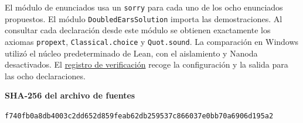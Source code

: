 \documentclass[spanish,11pt,a4paper]{article}
\begin{document}
El módulo de enunciados usa un \texttt{sorry} para cada uno de los ocho enunciados propuestos. El módulo \texttt{DoubledEarsSolution} importa las demostraciones. Al consultar cada declaración desde este módulo se obtienen exactamente los axiomas \texttt{propext}, \texttt{Classical.choice} y \texttt{Quot.sound}. La comparación en Windows utilizó el núcleo predeterminado de Lean, con el aislamiento y Nanoda desactivados. El \href{https://github.com/jtraverso/nash-williams-triangle-decompositions-release/tree/doubled-ears-preprint-1.0-r3/series_notes/DOUBLED_EAR_ABSORBERS/preprint-1.0/formalization}{registro de verificación} recoge la configuración y la salida para las ocho declaraciones.

\textbf{SHA-256 del archivo de fuentes}

\nolinkurl{f740fb0a8db4003c2dd652d859feab62db259537c866037e0bb70a6906d195a2}
\end{document}
